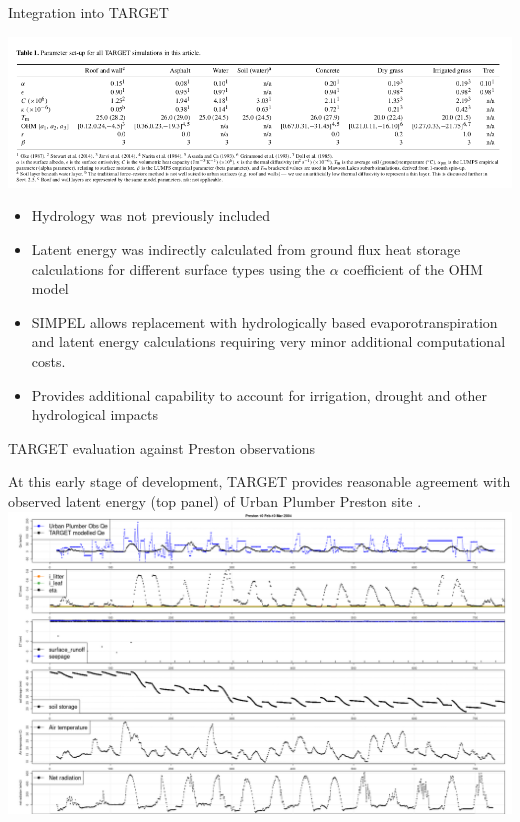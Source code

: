 \documentclass{beamer}
\begin{document}
\begin{frame}{Integration into TARGET} 

\includegraphics[scale=0.45]{TARGET3.png}

\begin{itemize}
\item Hydrology was not previously included
\item Latent energy was indirectly calculated from ground flux heat storage calculations for different surface types using the $\alpha$ coefficient of the OHM model
\item SIMPEL allows replacement with hydrologically based evaporotranspiration and latent energy calculations requiring very minor additional computational costs.
\item Provides additional capability to account for irrigation, drought and other hydrological impacts
\end{itemize}
\end{frame}


\begin{frame}{TARGET evaluation against Preston observations} 

{\footnotesize At this early stage of development, TARGET provides reasonable agreement with observed latent energy (top panel) of Urban Plumber Preston site \citep{Coutts2007}.}
\\
\includegraphics[scale=0.20]{PrestonFeb2004_4mmIrr_ground.png}
\end{frame}
\end{document}
